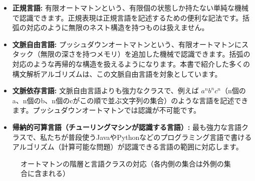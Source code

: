 \begin{itemize}
\tightlist
\item
  \textbf{正規言語:}
  有限オートマトンという、有限個の状態しか持たない単純な機械で認識できます。正規表現は正規言語を記述するための便利な記法です。括弧の対応のように無限のネスト構造を持つものは扱えません。
\item
  \textbf{文脈自由言語:}
  プッシュダウンオートマトンという、有限オートマトンにスタック（無限の深さを持つメモリ）を追加した機械で認識できます。括弧の対応のような再帰的な構造を扱えるようになります。本書で紹介した多くの構文解析アルゴリズムは、この文脈自由言語を対象としています。
\item
  \textbf{文脈依存言語:} 文脈自由言語よりも強力なクラスで、例えば
  \(a^n b^n c^n\)（n個のa、n個のb、n個のcがこの順で並ぶ文字列の集合）のような言語を記述できます。プッシュダウンオートマトンでは認識が不可能です。
\item
  \textbf{帰納的可算言語（チューリングマシンが認識する言語）:}
  最も強力な言語クラスで、私たちが普段使うJavaやPythonなどのプログラミング言語で書けるアルゴリズム（計算可能な問題）が認識できる言語の範囲に対応します。
\end{itemize}

\begin{figure}[h]
\centering
{}
\caption{オートマトンの階層と言語クラスの対応（各内側の集合は外側の集合に含まれる）}
\label{fig:automaton-hierarchy}
\end{figure}

